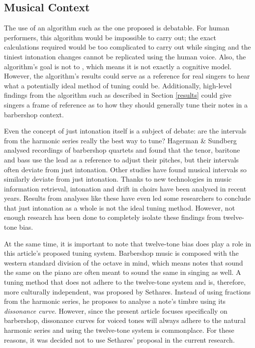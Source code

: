 \documentclass[a4paper]{article}
\begin{document}
\subsection{Musical Context}
The use of an algorithm such as the one proposed is debatable. For human performers, this algorithm would be impossible to carry out; the exact calculations required would be too complicated to carry out while singing and the tiniest intonation changes cannot be replicated using the human voice. Also, the algorithm's goal is not to , which means it is not exactly a cognitive model. \cite{van_maanen_interpretation_2021} However, the algorithm's results could serve as a reference for real singers to hear what a potentially ideal method of tuning could be. Additionally, high-level findings from the algorithm such as described in Section \ref{results} could give singers a frame of reference as to how they should generally tune their notes in a barbershop context.

Even the concept of just intonation itself is a subject of debate: are the intervals from the harmonic series really the best way to tune? Hagerman \& Sundberg \cite{hagerman_fundamental_1980} analysed recordings of barbershop quartets and found that the tenor, baritone and bass use the lead as a reference to adjust their pitches, but their intervals often deviate from just intonation. \cite{abbott_acoustic_2001} Other studies have found musical intervals so similarly deviate from just intonation. \cite{nordmark_intonation_1996, sundberg_rules_2009} Thanks to new technologies in music information retrieval, intonation and drift in choirs have been analysed in recent years. \cite{devaney_study_2012, mauch_intonation_2014, dai_intonation_2019} Results from analyses like these have even led some researchers to conclude that just intonation as a whole is not the ideal tuning method. \cite{parncutt_psychocultural_2018, kopiez_intonation_2003} However, not enough research has been done to completely isolate these findings from twelve-tone bias. \cite{burns_7_1999}

At the same time, it is important to note that twelve-tone bias does play a role in this article's proposed tuning system. Barbershop music is composed with the western standard division of the octave in mind, which means notes that sound the same on the piano are often meant to sound the same in singing as well. A tuning method that does not adhere to the twelve-tone system and is, therefore, more culturally independent, was proposed by Sethares. \cite{sethares_adaptive_1994} Instead of using fractions from the harmonic series, he proposes to analyse a note's timbre using its \textit{dissonance curve}. However, since the present article focuses specifically on barbershop, dissonance curves for voiced tones will always adhere to the natural harmonic series \cite{duifhuis_measurement_1982} and using the twelve-tone system is commonplace. For these reasons, it was decided not to use Sethares' proposal in the current research.
\end{document}
